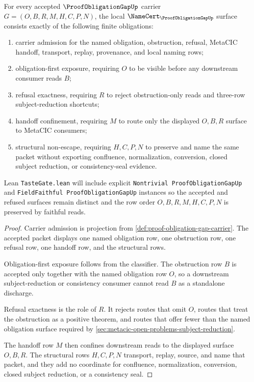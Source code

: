 \begin{theorem}
\label{thm:proof-obligation-gap-namecert-obligations}
For every accepted $\ProofObligationGapUp$ carrier $G=(O,B,R,M,H,C,P,N)$, the local $\NameCert_{\ProofObligationGapUp}$ surface consists exactly of the following finite obligations:
\begin{enumerate}
\item carrier admission for the named obligation, obstruction, refusal, MetaCIC handoff, transport, replay, provenance, and local naming rows;
\item obligation-first exposure, requiring $O$ to be visible before any downstream consumer reads $B$;
\item refusal exactness, requiring $R$ to reject obstruction-only reads and three-row subject-reduction shortcuts;
\item handoff confinement, requiring $M$ to route only the displayed $O,B,R$ surface to MetaCIC consumers;
\item structural non-escape, requiring $H,C,P,N$ to preserve and name the same packet without exporting confluence, normalization, conversion, closed subject reduction, or consistency-seal evidence.
\end{enumerate}
Lean \texttt{TasteGate.lean} will include explicit \texttt{Nontrivial ProofObligationGapUp} and \texttt{FieldFaithful ProofObligationGapUp} instances so the accepted and refused surfaces remain distinct and the row order $O,B,R,M,H,C,P,N$ is preserved by faithful reads.
\end{theorem}
\begin{proof}
Carrier admission is projection from \autoref{def:proof-obligation-gap-carrier}. The accepted packet displays one named obligation row, one obstruction row, one refusal row, one handoff row, and the structural rows.

Obligation-first exposure follows from the classifier. The obstruction row $B$ is accepted only together with the named obligation row $O$, so a downstream subject-reduction or consistency consumer cannot read $B$ as a standalone discharge.

Refusal exactness is the role of $R$. It rejects routes that omit $O$, routes that treat the obstruction as a positive theorem, and routes that offer fewer than the named obligation surface required by \autoref{sec:metacic-open-problems-subject-reduction}.

The handoff row $M$ then confines downstream reads to the displayed surface $O,B,R$. The structural rows $H,C,P,N$ transport, replay, source, and name that packet, and they add no coordinate for confluence, normalization, conversion, closed subject reduction, or a consistency seal.
\end{proof}

